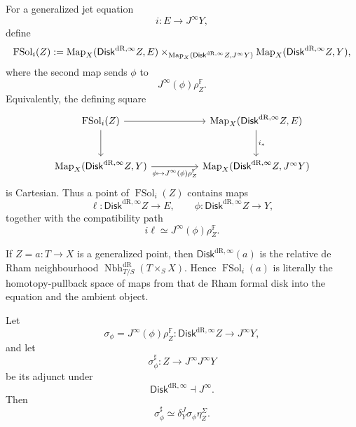 \begin{definition}
For a generalized jet equation
\[
  i:E\to J^\infty Y,
\]
define
\[
  \operatorname{FSol}_i(Z)
  :=
  \operatorname{Map}_X(\mathsf{Disk}^{\mathrm{dR},\infty} Z,E)
  \times_{\operatorname{Map}_X(\mathsf{Disk}^{\mathrm{dR},\infty} Z,J^\infty Y)}
  \operatorname{Map}_X(\mathsf{Disk}^{\mathrm{dR},\infty} Z,Y),
\]
where the second map sends \(\phi\) to
\[
  J^\infty(\phi)\rho_Z^{\mathbb F}.
\]
Equivalently, the defining square
\[
\begin{tikzcd}[column sep=huge,row sep=large]
\operatorname{FSol}_i(Z)
  \ar[r]
  \ar[d]
&
\Map_X(\mathsf{Disk}^{\mathrm{dR},\infty} Z,E)
  \ar[d,"i_*"]\\
\Map_X(\mathsf{Disk}^{\mathrm{dR},\infty} Z,Y)
  \ar[r,"\phi\mapsto J^\infty(\phi)\rho_Z^{\mathbb F}"']
&
\Map_X(\mathsf{Disk}^{\mathrm{dR},\infty} Z,J^\infty Y)
\end{tikzcd}
\]
is Cartesian. Thus a point of \(\operatorname{FSol}_i(Z)\) contains maps
\[
  \ell:\mathsf{Disk}^{\mathrm{dR},\infty} Z\to E,
  \qquad
  \phi:\mathsf{Disk}^{\mathrm{dR},\infty} Z\to Y,
\]
together with the compatibility path
\[
  i\ell
  \simeq
  J^\infty(\phi)\rho_Z^{\mathbb F}.
\]
\end{definition}

\begin{remark}
If \(Z=a:T\to X\) is a generalized point, then
\(\mathsf{Disk}^{\mathrm{dR},\infty}(a)\) is the relative de Rham neighbourhood
\(\operatorname{Nbh}^{\mathrm{dR}}_{T/S}(T\times_SX)\). Hence \(\operatorname{FSol}_i(a)\) is literally
the homotopy-pullback space of maps from that de Rham formal disk into the equation and
the ambient object.
\end{remark}

\begin{proposition}
\label{prop:adjoint-cartan-lift}
Let
\[
  \sigma_\phi
  =
  J^\infty(\phi)\rho_Z^{\mathbb F}:
  \mathsf{Disk}^{\mathrm{dR},\infty} Z\to J^\infty Y,
\]
and let
\[
  \sigma_\phi^\sharp:
  Z\to J^\infty J^\infty Y
\]
be its adjunct under
\[
  \mathsf{Disk}^{\mathrm{dR},\infty}\dashv J^\infty.
\]
Then
\[
  \sigma_\phi^\sharp
  \simeq
  \delta^J_Y\sigma_\phi\eta^\Sigma_Z.
\]
\end{proposition}

